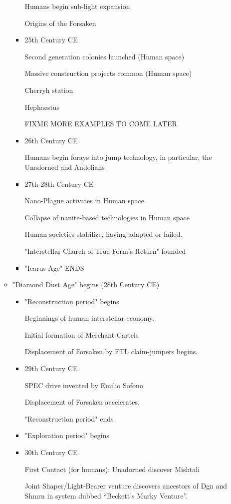 \begin{itemize}
\begin{itemize}
\begin{itemize}
Humans begin sub-light expansion 

Origins of the Forsaken 

\item	25th Century CE 

Second generation colonies launched (Human space) 

Massive construction projects common (Human space) 

Cherryh station 

Hephaestus 

FIXME MORE EXAMPLES TO COME LATER 
\item	26th Century CE 

Humans begin forays into jump technology, in particular, the Unadorned
and Andolians

\item	27th-28th Century CE 

Nano-Plague activates in Human space 

Collapse of nanite-based technologies in Human space 

Human societies stabilize, having adapted or failed. 

"Interstellar Church of True Form's Return" founded 

\item "Icarus Age" ENDS 
\end{itemize}
\item "Diamond Dust Age" begins (28th Century CE) 
\begin{itemize}
\item	"Reconstruction period" begins 

Beginnings of human interstellar economy. 

Initial formation of Merchant Cartels 

Displacement of Forsaken by FTL claim-jumpers begins. 

\item	29th Century CE 

SPEC drive invented by Emilio Sofono 

Displacement of Forsaken accelerates. 

"Reconstruction period" ends 

\item	"Exploration period" begins 
\item	30th Century CE 

First Contact (for humans): Unadorned discover Mishtali 

Joint Shaper/Light-Bearer venture discovers ancestors of Dgn and Shmrn
in system dubbed ``Beckett's Murky Venture''.


\end{itemize}
\end{itemize}
\end{itemize}

